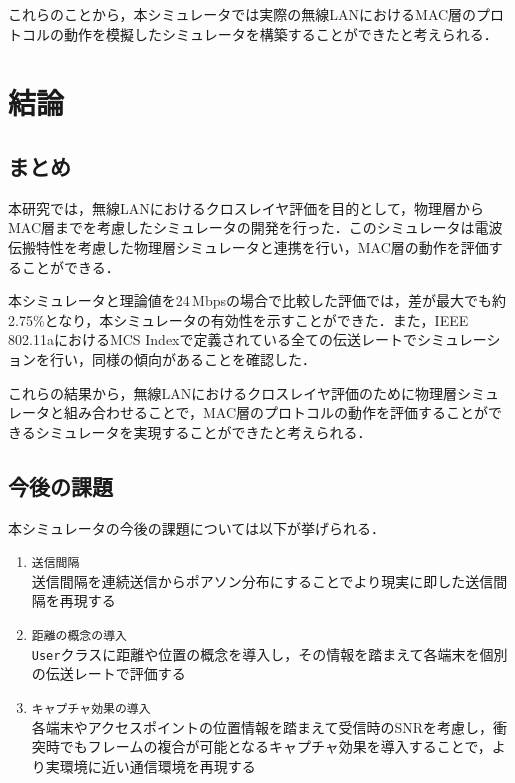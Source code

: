 \documentclass[a4paper,10pt]{ltjsarticle}
\begin{document}
これらのことから，本シミュレータでは実際の無線LANにおけるMAC層のプロトコルの動作を模擬したシミュレータを構築することができたと考えられる．

\clearpage
\section{結論}
\subsection{まとめ}
本研究では，無線LANにおけるクロスレイヤ評価を目的として，物理層からMAC層までを考慮したシミュレータの開発を行った．このシミュレータは電波伝搬特性を考慮した物理層シミュレータと連携を行い，MAC層の動作を評価することができる．

本シミュレータと理論値を24\,Mbpsの場合で比較した評価では，差が最大でも約2.75\%となり，本シミュレータの有効性を示すことができた．また，IEEE 802.11aにおけるMCS Indexで定義されている全ての伝送レートでシミュレーションを行い，同様の傾向があることを確認した．

これらの結果から，無線LANにおけるクロスレイヤ評価のために物理層シミュレータと組み合わせることで，MAC層のプロトコルの動作を評価することができるシミュレータを実現することができたと考えられる．



\subsection{今後の課題}
本シミュレータの今後の課題については以下が挙げられる．

\begin{enumerate}
  \item \texttt{送信間隔}\\送信間隔を連続送信からポアソン分布にすることでより現実に即した送信間隔を再現する
  \item \texttt{距離の概念の導入}\\\texttt{User}クラスに距離や位置の概念を導入し，その情報を踏まえて各端末を個別の伝送レートで評価する
  \item \texttt{キャプチャ効果の導入}\\各端末やアクセスポイントの位置情報を踏まえて受信時のSNRを考慮し，衝突時でもフレームの複合が可能となるキャプチャ効果を導入することで，より実環境に近い通信環境を再現する
\end{enumerate}
\end{document}
